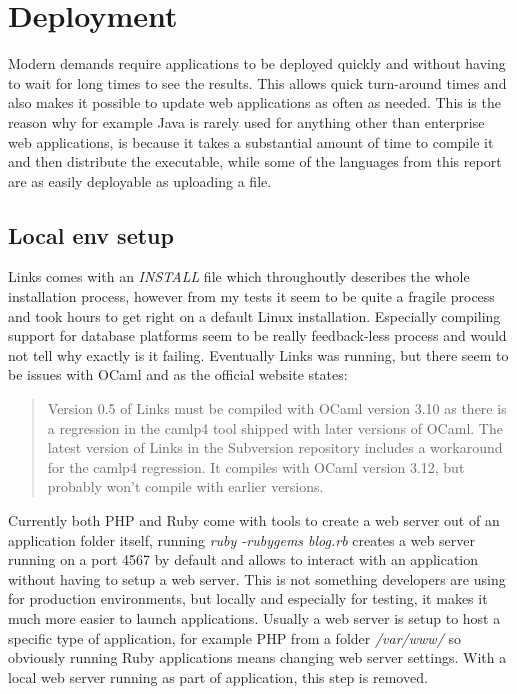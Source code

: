 \chapter{Deployment}

Modern demands require applications to be deployed quickly and without having to wait for long times to see the results. This allows quick turn-around times and also makes it possible to update web applications as often as needed. This is the reason why for example Java is rarely used for anything other than enterprise web applications, is because it takes a substantial amount of time to compile it and then distribute the executable, while some of the languages from this report are as easily deployable as uploading a file.

\section{Local env setup}

Links comes with an \textit{INSTALL} file which throughoutly describes the whole installation process, however from my tests it seem to be quite a fragile process and took hours to get right on a default Linux installation. Especially compiling support for database platforms seem to be really feedback-less process and would not tell why exactly is it failing. Eventually Links was running, but there seem to be issues with OCaml and as the official website states: 

\begin{quote}
Version 0.5 of Links must be compiled with OCaml version 3.10 as there is a regression in the camlp4 tool shipped with later versions of OCaml. The latest version of Links in the Subversion repository includes a workaround for the camlp4 regression. It compiles with OCaml version 3.12, but probably won't compile with earlier versions.
\end{quote}

Currently both PHP and Ruby come with tools to create a web server out of an application folder itself, running \textit{ruby -rubygems blog.rb} creates a web server running on a port 4567 by default and allows to interact with an application without having to setup a web server. This is not something developers are using for production environments, but locally and especially for testing, it makes it much more easier to launch applications. Usually a web server is setup to host a specific type of application, for example PHP from a folder \textit{/var/www/} so obviously running Ruby applications means changing web server settings. With a local web server running as part of application, this step is removed. 

